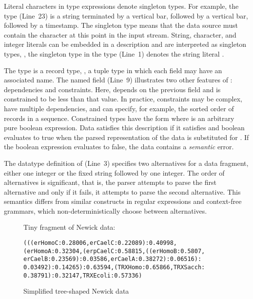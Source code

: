 Literal characters in type expressions denote singleton types.  For
example, the  type (Line~23) is a string terminated by a
vertical bar, followed by a vertical bar, followed by a timestamp.  The
singleton type  means that the data source must contain the
character  at this point in the input stream.  String,
character, and integer literals can be embedded in a description and
are interpreted as singleton types, \eg{}, the singleton type
 in the  type (Line~1) 
denotes the string literal .

The type  is a record type, \ie{}, a tuple type in
which each field may have an associated name.  The named field
 (Line~9) illustrates two other features of
\padsml: dependencies and constraints.  Here, 
depends on the previous field  and is constrained to be
less than that value.  In practice, constraints may be complex, have
multiple dependencies, and can specify, for example, the sorted order
of records in a sequence.  Constrained types have the form \cd{[x:T |
e]} where  is an arbitrary pure boolean expression.  Data
satisfies this description if it satisfies  and boolean 
evaluates to true when the parsed representation of the data is
substituted for .  If the boolean expression evaluates to false,
the data contains a \textit{semantic} error.

The datatype definition of  (Line~3) specifies two
alternatives for a data fragment, either one integer or the fixed
string  followed by one integer.  The order of
alternatives is significant, that is, the parser attempts to parse the
first alternative and only if it fails, it attempts to parse the
second alternative.  This semantics differs from similar constructs in
regular expressions and context-free grammars, which
non-deterministically choose between alternatives.
\begin{figure}

Tiny fragment of Newick data:

{
\begin{verbatim}
(((erHomoC:0.28006,erCaelC:0.22089):0.40998,
(erHomoA:0.32304,(erpCaelC:0.58815,((erHomoB:0.5807,
erCaelB:0.23569):0.03586,erCaelA:0.38272):0.06516):
0.03492):0.14265):0.63594,(TRXHomo:0.65866,TRXSacch:
0.38791):0.32147,TRXEcoli:0.57336)
\end{verbatim}
}
  \caption{Simplified tree-shaped Newick data}
  \label{fig:newick}
\end{figure}

